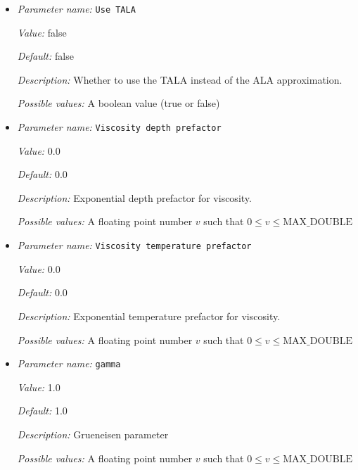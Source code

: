 \begin{itemize}
{\it Default:} 1.0


{\it Description:} The value of the specific heat $C_p$. Units: $J/kg/K$.


{\it Possible values:} A floating point number $v$ such that $0 \leq v \leq \text{MAX\_DOUBLE}$
\item {\it Parameter name:} {\tt Use TALA}
\label{parameters:Material model/Nondimensional model/Use TALA}


{\it Value:} false


{\it Default:} false


{\it Description:} Whether to use the TALA instead of the ALA approximation.


{\it Possible values:} A boolean value (true or false)
\item {\it Parameter name:} {\tt Viscosity depth prefactor}
\label{parameters:Material model/Nondimensional model/Viscosity depth prefactor}


{\it Value:} 0.0


{\it Default:} 0.0


{\it Description:} Exponential depth prefactor for viscosity.


{\it Possible values:} A floating point number $v$ such that $0 \leq v \leq \text{MAX\_DOUBLE}$
\item {\it Parameter name:} {\tt Viscosity temperature prefactor}
\label{parameters:Material model/Nondimensional model/Viscosity temperature prefactor}


{\it Value:} 0.0


{\it Default:} 0.0


{\it Description:} Exponential temperature prefactor for viscosity.


{\it Possible values:} A floating point number $v$ such that $0 \leq v \leq \text{MAX\_DOUBLE}$
\item {\it Parameter name:} {\tt gamma}
\label{parameters:Material model/Nondimensional model/gamma}


{\it Value:} 1.0


{\it Default:} 1.0


{\it Description:} Grueneisen parameter


{\it Possible values:} A floating point number $v$ such that $0 \leq v \leq \text{MAX\_DOUBLE}$
\end{itemize}

